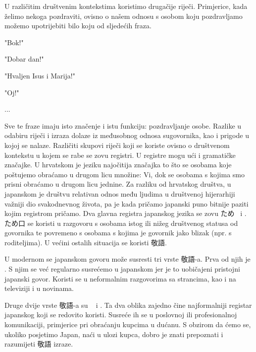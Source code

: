 
\author{Ivan Petranović}

	
	
	U različitim društvenim kontekstima koristimo drugačije riječi. Primjerice, kada želimo nekoga pozdraviti, ovisno o našem odnosu s osobom koju pozdravljamo možemo upotrijebiti bilo koju od sljedećih fraza.
	\begin{hyou}
	\item "Bok!"
	\item "Dobar dan!"
	\item "Hvaljen Isus i Marija!"
	\item "Oj!"
	\item ...
	\end{hyou}
	Sve te fraze imaju isto značenje i istu funkciju: pozdravljanje osobe. Razlike u odabiru riječi i izraza dolaze iz međusobnog odnosa sugovornika, kao i prigode u kojoj se nalaze. Različiti skupovi riječi koji se koriste ovisno o društvenom kontekstu u kojem se rabe se zovu registri. U registre mogu ući i gramatičke značajke. U hrvatskom je jeziku najočitija značajka to što se osobama koje poštujemo obraćamo u drugom licu množine: Vi, dok se osobama s kojima smo prisni obraćamo u drugom licu jednine.
	Za razliku od hrvatskog društva, u japanskom je društvu relativan odnos među ljudima u društvenoj hijerarhiji važniji dio svakodnevnog života, pa je kada pričamo japanski puno bitnije paziti kojim registrom pričamo.
	Dva glavna registra japanskog jezika se zovu ため~ i . ため口 se koristi u razgovoru s osobama istog ili nižeg društvenog statusa od govornika te povremeno s osobama s kojima je govornik jako blizak (npr. s roditeljima). U većini ostalih situacija se koristi 敬語.

	
	U modernom se japanskom govoru može susresti tri vrste 敬語-a. Prva od njih je . S njim se već regularno susrećemo u japanskom jer je to uobičajeni pristojni japanski govor. Koristi se u neformalnim razgovorima sa strancima, kao i na televiziji i u novinama.
		
	Druge dvije vrste 敬語-a su ~ i . Ta dva oblika zajedno čine najformalniji registar japanskog koji se redovito koristi. Susreće ih se u poslovnoj ili profesionalnoj komunikaciji, primjerice pri obraćanju kupcima u dućanu. S obzirom da ćemo se, ukoliko posjetimo Japan, naći u ulozi kupca, dobro je znati prepoznati i razumijeti 敬語 izraze.
		

